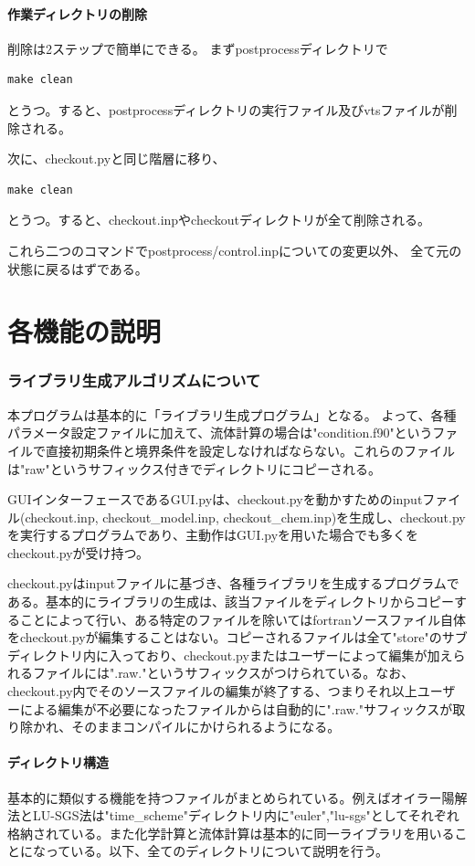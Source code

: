 \documentclass{jsarticle}
\begin{document}
\subsection{作業ディレクトリの削除}%
削除は2ステップで簡単にできる。
まずpostprocessディレクトリで
\begin{verbatim}
make clean
\end{verbatim}
とうつ。すると、postprocessディレクトリの実行ファイル及びvtsファイルが削除される。

次に、checkout.pyと同じ階層に移り、
\begin{verbatim}
make clean
\end{verbatim}
とうつ。すると、checkout.inpやcheckoutディレクトリが全て削除される。

これら二つのコマンドでpostprocess/control.inpについての変更以外、
全て元の状態に戻るはずである。
\newpage

\part{各機能の説明}
\newpage
\section{ライブラリ生成アルゴリズムについて}%
本プログラムは基本的に「ライブラリ生成プログラム」となる。
よって、各種パラメータ設定ファイルに加えて、流体計算の場合は"condition.f90"というファイルで直接初期条件と境界条件を設定しなければならない。これらのファイルは"raw"というサフィックス付きでディレクトリにコピーされる。

GUIインターフェースであるGUI.pyは、checkout.pyを動かすためのinputファイル(checkout.inp, checkout\_model.inp, checkout\_chem.inp)を生成し、checkout.pyを実行するプログラムであり、主動作はGUI.pyを用いた場合でも多くをcheckout.pyが受け持つ。

checkout.pyはinputファイルに基づき、各種ライブラリを生成するプログラムである。基本的にライブラリの生成は、該当ファイルをディレクトリからコピーすることによって行い、ある特定のファイルを除いてはfortranソースファイル自体をcheckout.pyが編集することはない。コピーされるファイルは全て"store"のサブディレクトリ内に入っており、checkout.pyまたはユーザーによって編集が加えられるファイルには".raw."というサフィックスがつけられている。なお、checkout.py内でそのソースファイルの編集が終了する、つまりそれ以上ユーザーによる編集が不必要になったファイルからは自動的に".raw."サフィックスが取り除かれ、そのままコンパイルにかけられるようになる。
\subsection{ディレクトリ構造}
基本的に類似する機能を持つファイルがまとめられている。例えばオイラー陽解法とLU-SGS法は"time\_scheme"ディレクトリ内に"euler","lu-sgs"としてそれぞれ格納されている。また化学計算と流体計算は基本的に同一ライブラリを用いることになっている。以下、全てのディレクトリについて説明を行う。
\newpage
\end{document}
